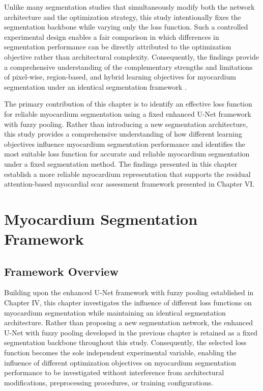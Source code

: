 Unlike many segmentation studies that simultaneously modify both the network architecture and the optimization strategy, this study intentionally fixes the segmentation backbone while varying only the loss function. Such a controlled experimental design enables a fair comparison in which differences in segmentation performance can be directly attributed to the optimization objective rather than architectural complexity. Consequently, the findings provide a comprehensive understanding of the complementary strengths and limitations of pixel-wise, region-based, and hybrid learning objectives for myocardium segmentation under an identical segmentation framework \citep{Riandini2025Array}.

The primary contribution of this chapter is to identify an effective loss function for reliable myocardium segmentation using a fixed enhanced U-Net framework with fuzzy pooling. Rather than introducing a new segmentation architecture, this study provides a comprehensive understanding of how different learning objectives influence myocardium segmentation performance and identifies the most suitable loss function for accurate and reliable myocardium segmentation under a fixed segmentation method. The findings presented in this chapter establish a more reliable myocardium representation that supports the residual attention-based myocardial scar assessment framework presented in Chapter VI. 

\section{Myocardium Segmentation Framework}
\label{sec:ch5-framework} 

\subsection{Framework Overview}
\label{subsec:ch5-overview}  

Building upon the enhanced U-Net framework with fuzzy pooling established in Chapter IV, this chapter investigates the influence of different loss functions on myocardium segmentation while maintaining an identical segmentation architecture. Rather than proposing a new segmentation network, the enhanced U-Net with fuzzy pooling developed in the previous chapter is retained as a fixed segmentation backbone throughout this study. Consequently, the selected loss function becomes the sole independent experimental variable, enabling the influence of different optimization objectives on myocardium segmentation performance to be investigated without interference from architectural modifications, preprocessing procedures, or training configurations.   

